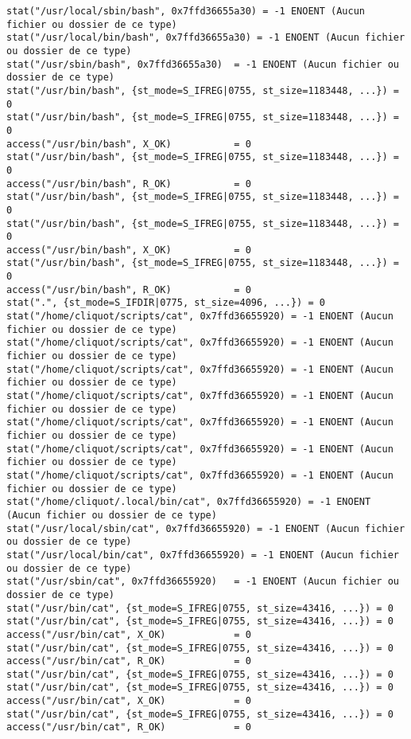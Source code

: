 \documentclass[11pt]{article}
\begin{document}
\begin{lstlisting}
stat("/usr/local/sbin/bash", 0x7ffd36655a30) = -1 ENOENT (Aucun fichier ou dossier de ce type)
stat("/usr/local/bin/bash", 0x7ffd36655a30) = -1 ENOENT (Aucun fichier ou dossier de ce type)
stat("/usr/sbin/bash", 0x7ffd36655a30)  = -1 ENOENT (Aucun fichier ou dossier de ce type)
stat("/usr/bin/bash", {st_mode=S_IFREG|0755, st_size=1183448, ...}) = 0
stat("/usr/bin/bash", {st_mode=S_IFREG|0755, st_size=1183448, ...}) = 0
access("/usr/bin/bash", X_OK)           = 0
stat("/usr/bin/bash", {st_mode=S_IFREG|0755, st_size=1183448, ...}) = 0
access("/usr/bin/bash", R_OK)           = 0
stat("/usr/bin/bash", {st_mode=S_IFREG|0755, st_size=1183448, ...}) = 0
stat("/usr/bin/bash", {st_mode=S_IFREG|0755, st_size=1183448, ...}) = 0
access("/usr/bin/bash", X_OK)           = 0
stat("/usr/bin/bash", {st_mode=S_IFREG|0755, st_size=1183448, ...}) = 0
access("/usr/bin/bash", R_OK)           = 0
stat(".", {st_mode=S_IFDIR|0775, st_size=4096, ...}) = 0
stat("/home/cliquot/scripts/cat", 0x7ffd36655920) = -1 ENOENT (Aucun fichier ou dossier de ce type)
stat("/home/cliquot/scripts/cat", 0x7ffd36655920) = -1 ENOENT (Aucun fichier ou dossier de ce type)
stat("/home/cliquot/scripts/cat", 0x7ffd36655920) = -1 ENOENT (Aucun fichier ou dossier de ce type)
stat("/home/cliquot/scripts/cat", 0x7ffd36655920) = -1 ENOENT (Aucun fichier ou dossier de ce type)
stat("/home/cliquot/scripts/cat", 0x7ffd36655920) = -1 ENOENT (Aucun fichier ou dossier de ce type)
stat("/home/cliquot/scripts/cat", 0x7ffd36655920) = -1 ENOENT (Aucun fichier ou dossier de ce type)
stat("/home/cliquot/scripts/cat", 0x7ffd36655920) = -1 ENOENT (Aucun fichier ou dossier de ce type)
stat("/home/cliquot/.local/bin/cat", 0x7ffd36655920) = -1 ENOENT (Aucun fichier ou dossier de ce type)
stat("/usr/local/sbin/cat", 0x7ffd36655920) = -1 ENOENT (Aucun fichier ou dossier de ce type)
stat("/usr/local/bin/cat", 0x7ffd36655920) = -1 ENOENT (Aucun fichier ou dossier de ce type)
stat("/usr/sbin/cat", 0x7ffd36655920)   = -1 ENOENT (Aucun fichier ou dossier de ce type)
stat("/usr/bin/cat", {st_mode=S_IFREG|0755, st_size=43416, ...}) = 0
stat("/usr/bin/cat", {st_mode=S_IFREG|0755, st_size=43416, ...}) = 0
access("/usr/bin/cat", X_OK)            = 0
stat("/usr/bin/cat", {st_mode=S_IFREG|0755, st_size=43416, ...}) = 0
access("/usr/bin/cat", R_OK)            = 0
stat("/usr/bin/cat", {st_mode=S_IFREG|0755, st_size=43416, ...}) = 0
stat("/usr/bin/cat", {st_mode=S_IFREG|0755, st_size=43416, ...}) = 0
access("/usr/bin/cat", X_OK)            = 0
stat("/usr/bin/cat", {st_mode=S_IFREG|0755, st_size=43416, ...}) = 0
access("/usr/bin/cat", R_OK)            = 0

\end{lstlisting}
\end{document}
